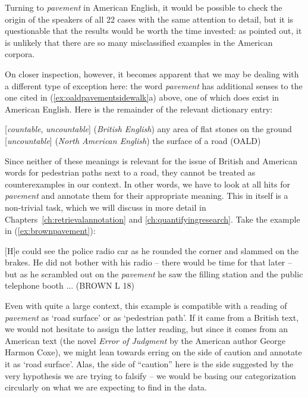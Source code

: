 Turning to \textit{pavement} in American English, it would be possible to check the origin of the speakers of all 22 cases with the same attention to detail, but it is questionable that the results would be worth the time invested: as pointed out, it is unlikely that there are so many misclassified examples in the American  corpora.

On closer inspection, however, it becomes apparent that we may be dealing with a different type of exception here: the word \textit{pavement} has additional senses to the one cited in (\ref{ex:oaldpavementsidewalk}a) above, one of which does exist in American  English. Here is the remainder of the relevant dictionary  entry:

\begin{exe}
\ex
\begin{xlist}
\label{ex:restoaldpavement}
 [\textit{countable}, \textit{uncountable}] (\textit{British English}) any area of flat stones on the ground
 [\textit{uncountable}] (\textit{North American English}) the surface of a road (OALD)
\end{xlist}
\end{exe}

Since neither of these meanings  is relevant for the issue of British  and American  words for pedestrian paths next to a road, they cannot be treated as counterexamples  in our context. In other words, we have to look at all hits  for \textit{pavement} and annotate  them for their appropriate meaning. This in itself is a non\hyp{}trivial task, which we will discuss in more detail in Chapters~\ref{ch:retrievalannotation} and \ref{ch:quantifyingresearch}. Take the example in (\ref{ex:brownpavement}):

\begin{exe}
\ex $[$H$]$e could see the police radio car as he rounded the corner and slammed on the brakes. He did not bother with his radio -- there would be time for that later -- but as he scrambled out on the \textit{pavement} he saw the filling station and the public telephone booth ... (BROWN L 18)
\label{ex:brownpavement}
\end{exe}

Even with quite a large context, this example is compatible with a reading of \textit{pavement} as `road surface' or as `pedestrian path'. If it came from a British  text, we would not hesitate to assign the latter reading, but since it comes from an American  text (the novel  \textit{Error of Judgment} by the American author George Harmon Coxe), we might lean towards erring on the side of caution and annotate  it as `road surface'. Alas, the side of ``caution'' here is the side suggested by the very hypothesis  we are trying to falsify  -- we would be basing our categorization  circularly on what we are expecting to find in the data.

